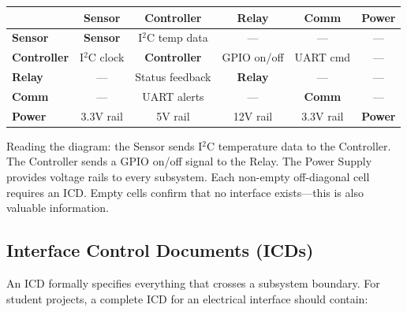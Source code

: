 \documentclass[11pt,letterpaper,twoside,openany]{book}
\begin{document}
\begin{keyconceptbox}
\begin{center}\small
\begin{tabular}{l|c|c|c|c|c}
 & \textbf{Sensor} & \textbf{Controller} & \textbf{Relay} & \textbf{Comm} & \textbf{Power} \\
\hline
\textbf{Sensor} & \cellcolor{LightBG}\textbf{Sensor} & I$^2$C temp data & --- & --- & --- \\
\hline
\textbf{Controller} & I$^2$C clock & \cellcolor{LightBG}\textbf{Controller} & GPIO on/off & UART cmd & --- \\
\hline
\textbf{Relay} & --- & Status feedback & \cellcolor{LightBG}\textbf{Relay} & --- & --- \\
\hline
\textbf{Comm} & --- & UART alerts & --- & \cellcolor{LightBG}\textbf{Comm} & --- \\
\hline
\textbf{Power} & 3.3V rail & 5V rail & 12V rail & 3.3V rail & \cellcolor{LightBG}\textbf{Power} \\
\end{tabular}
\end{center}

Reading the diagram: the Sensor sends I$^2$C temperature data to the Controller. The Controller sends a GPIO on/off signal to the Relay. The Power Supply provides voltage rails to every subsystem. Each non-empty off-diagonal cell requires an ICD. Empty cells confirm that no interface exists---this is also valuable information.
\end{keyconceptbox}

\subsection{Interface Control Documents (ICDs)}
An ICD formally specifies everything that crosses a subsystem boundary. For student projects, a complete ICD for an electrical interface should contain:
\end{document}
